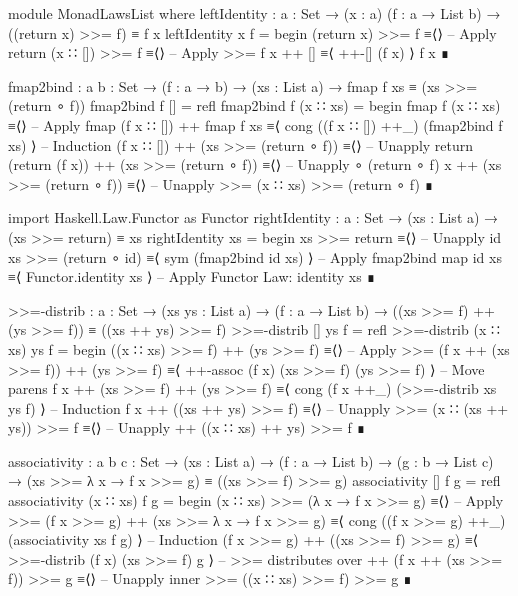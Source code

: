 \documentclass{article}
\begin{document}
\begin{code}
module MonadLawsList where
  leftIdentity : {a : Set} → (x : a) (f : a → List b)
    → ((return x) >>= f) ≡ f x
  leftIdentity x f =
    begin
      (return x) >>= f
    ≡⟨⟩ -- Apply return
      (x ∷ []) >>= f
    ≡⟨⟩ -- Apply >>=
      f x ++ []
    ≡⟨ ++-[] (f x) ⟩
      f x
    ∎
\end{code}
\begin{code}
  fmap2bind : {a b : Set} → (f : a → b) → (xs : List a)
    → fmap f xs ≡ (xs >>= (return ∘ f))
  fmap2bind f [] = refl
  fmap2bind f (x ∷ xs) =
    begin
      fmap f (x ∷ xs)
    ≡⟨⟩ -- Apply fmap
      (f x ∷ []) ++ fmap f xs
    ≡⟨ cong ((f x ∷ []) ++_) (fmap2bind f xs) ⟩ -- Induction
      (f x ∷ []) ++ (xs >>= (return ∘ f))
    ≡⟨⟩ -- Unapply return
      (return (f x)) ++ (xs >>= (return ∘ f))
    ≡⟨⟩ -- Unapply ∘
      (return ∘ f) x ++ (xs >>= (return ∘ f))
    ≡⟨⟩ -- Unapply >>=
      (x ∷ xs) >>= (return ∘ f)
    ∎
\end{code}
\begin{code}
  import Haskell.Law.Functor as Functor
  rightIdentity : {a : Set} → (xs : List a) → (xs >>= return) ≡ xs
  rightIdentity xs =
    begin
      xs >>= return
    ≡⟨⟩ -- Unapply id
      xs >>= (return ∘ id)
    ≡⟨ sym (fmap2bind id xs) ⟩ -- Apply fmap2bind
      map id xs
    ≡⟨ Functor.identity xs ⟩ -- Apply Functor Law: identity
      xs
    ∎
\end{code}
\begin{code}
  >>=-distrib : {a : Set} → (xs ys : List a) → (f : a → List b)
    → ((xs >>= f) ++ (ys >>= f)) ≡ ((xs ++ ys) >>= f)
  >>=-distrib [] ys f = refl
  >>=-distrib (x ∷ xs) ys f =
    begin
      ((x ∷ xs) >>= f) ++ (ys >>= f)
    ≡⟨⟩ -- Apply >>=
      (f x ++ (xs >>= f)) ++ (ys >>= f)
    ≡⟨ ++-assoc (f x) (xs >>= f) (ys >>= f) ⟩ -- Move parens
      f x ++ (xs >>= f) ++ (ys >>= f)
    ≡⟨ cong (f x ++_) (>>=-distrib xs ys f) ⟩ -- Induction
      f x ++ ((xs ++ ys) >>= f)
    ≡⟨⟩ -- Unapply >>=
      (x ∷ (xs ++ ys)) >>= f
    ≡⟨⟩ -- Unapply ++
      ((x ∷ xs) ++ ys) >>= f
    ∎
\end{code}
\begin{code}
  associativity : {a b c : Set}
    → (xs : List a) → (f : a → List b) → (g : b → List c)
    → (xs >>= λ x → f x >>= g) ≡ ((xs >>= f) >>= g)
  associativity [] f g = refl
  associativity (x ∷ xs) f g =
    begin
      (x ∷ xs) >>= (λ x → f x >>= g)
    ≡⟨⟩ -- Apply >>=
      (f x >>= g) ++ (xs >>= λ x → f x >>= g)
    ≡⟨ cong ((f x >>= g) ++_) (associativity xs f g) ⟩ -- Induction
      (f x >>= g) ++ ((xs >>= f) >>= g)
    ≡⟨ >>=-distrib (f x) (xs >>= f) g ⟩ -- >>= distributes over ++
      (f x ++ (xs >>= f)) >>= g
    ≡⟨⟩ -- Unapply inner >>=
      ((x ∷ xs) >>= f) >>= g
    ∎
\end{code}
\end{document}
